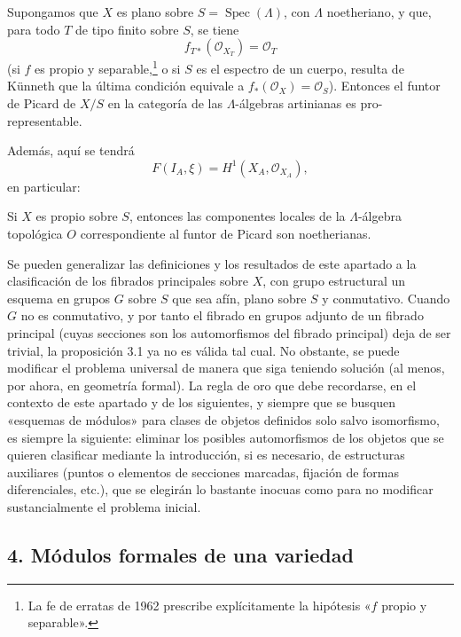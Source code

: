 Supongamos que $X$ es plano sobre
$S=\operatorname{Spec}(\Lambda)$, con $\Lambda$ noetheriano, y que, para todo
$T$ de tipo finito sobre $S$, se tiene
\[
  f_{T*}(\mathcal O_{X_T})=\mathcal O_T
\]
(si $f$ es propio y separable,\footnote{La fe de erratas de 1962 prescribe
explícitamente la hipótesis «$f$ propio y separable».} o si $S$ es el espectro
de un cuerpo, resulta de Künneth que la última condición equivale a
$f_*(\mathcal O_X)=\mathcal O_S$). Entonces el funtor de Picard de $X/S$ en la
categoría de las $\Lambda$-álgebras artinianas es pro-representable.

Además, aquí se tendrá
\[
  F(I_A,\xi)=H^1(X_A,\mathcal O_{X_A}),
\]
en particular:

 Si $X$ es propio sobre $S$, entonces las componentes
locales de la $\Lambda$-álgebra topológica $O$ correspondiente al funtor de
Picard son noetherianas.

 Se pueden generalizar las definiciones y los resultados
de este apartado a la clasificación de los fibrados principales sobre $X$, con
grupo estructural un esquema en grupos $G$ sobre $S$ que sea afín, plano sobre
$S$ y conmutativo. Cuando $G$ no es conmutativo, y por tanto el fibrado en
grupos adjunto de un fibrado principal (cuyas secciones son los automorfismos
del fibrado principal) deja de ser trivial, la proposición 3.1 ya no es válida
tal cual. No obstante, se puede modificar el problema universal de manera que
siga teniendo solución (al menos, por ahora, en geometría formal). La regla de
oro que debe recordarse, en el contexto de este apartado y de los
siguientes, y siempre que se busquen «esquemas de módulos» para clases de
objetos definidos solo salvo isomorfismo, es siempre la siguiente: eliminar
los posibles automorfismos de los objetos que se quieren clasificar mediante
la introducción, si es necesario, de estructuras auxiliares (puntos o
elementos de secciones marcadas, fijación de formas diferenciales, etc.), que
se elegirán lo bastante inocuas como para no modificar sustancialmente el
problema inicial.

\subsection*{4. Módulos formales de una variedad}

